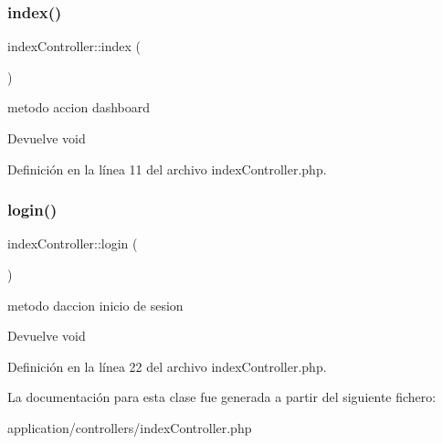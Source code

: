 \subsubsection{\texorpdfstring{index()}{index()}}
{\footnotesize\ttfamily index\+Controller\+::index (\begin{DoxyParamCaption}{ }\end{DoxyParamCaption})}

metodo accion dashboard

\begin{DoxyReturn}{Devuelve}
void 
\end{DoxyReturn}


Definición en la línea 11 del archivo index\+Controller.\+php.

\mbox{\label{classindex_controller_ad14fd2e2267073c8d3e13eb6ff7f7379}} 
\subsubsection{\texorpdfstring{login()}{login()}}
{\footnotesize\ttfamily index\+Controller\+::login (\begin{DoxyParamCaption}{ }\end{DoxyParamCaption})}

metodo daccion inicio de sesion

\begin{DoxyReturn}{Devuelve}
void 
\end{DoxyReturn}


Definición en la línea 22 del archivo index\+Controller.\+php.



La documentación para esta clase fue generada a partir del siguiente fichero\+:\begin{DoxyCompactItemize}
\item 
application/controllers/index\+Controller.\+php\end{DoxyCompactItemize}
